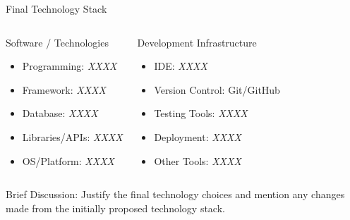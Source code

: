 \documentclass[aspectratio=169,11pt]{beamer}
\newcommand{\smallnote}[1]{%
\vspace{0.08cm}
{\scriptsize\color{GEUGrey}#1}
}
\newcommand{\placeholder}[1]{%
\textit{\color{GEUGrey}#1}
}
\begin{document}
\begin{frame}{Final Technology Stack}

\begin{columns}[T,totalwidth=\textwidth]


\begin{block}{Software / Technologies}
\begin{itemize}\itemsep2pt
    \item Programming: \placeholder{XXXX}
    \item Framework: \placeholder{XXXX}
    \item Database: \placeholder{XXXX}
    \item Libraries/APIs: \placeholder{XXXX}
    \item OS/Platform: \placeholder{XXXX}
\end{itemize}
\end{block}


\begin{block}{Development Infrastructure}
\begin{itemize}\itemsep2pt
    \item IDE: \placeholder{XXXX}
    \item Version Control: Git/GitHub
    \item Testing Tools: \placeholder{XXXX}
    \item Deployment: \placeholder{XXXX}
    \item Other Tools: \placeholder{XXXX}
\end{itemize}
\end{block}

\end{columns}

\vfill

\smallnote{
Brief Discussion: Justify the final technology choices and mention
any changes made from the initially proposed technology stack.
}

\end{frame}
\end{document}
